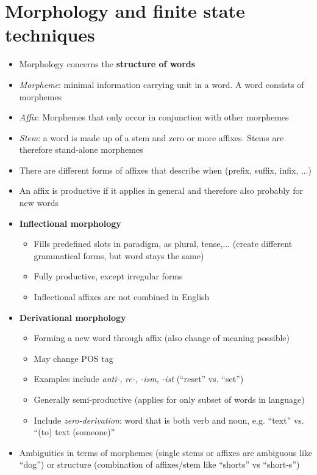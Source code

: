 \section{Morphology and finite state techniques}
\begin{itemize}
	\item Morphology concerns the \textbf{structure of words}
	\item \textit{Morpheme}: minimal information carrying unit in a word. A word consists of morphemes
	\item \textit{Affix}: Morphemes that only occur in conjunction with other morphemes
	\item \textit{Stem}: a word is made up of a stem and zero or more affixes. Stems are therefore stand-alone morphemes
	\item There are different forms of affixes that describe when (prefix, suffix, infix, ...)
	\item An affix is productive if it applies in general and therefore also probably for new words
	\item \textbf{Inflectional morphology}
	\begin{itemize}
		\item Fills predefined slots in paradigm, as plural, tense,... (create different grammatical forms, but word stays the same)
		\item Fully productive, except irregular forms
		\item Inflectional affixes are not combined in English
	\end{itemize}
	\item \textbf{Derivational morphology}
	\begin{itemize}
		\item Forming a new word through affix (also change of meaning possible)
		\item May change POS tag
		\item Examples include \textit{anti-}, \textit{re-}, \textit{-ism}, \textit{-ist} (``reset'' vs. ``set'')
		\item Generally semi-productive (applies for only subset of words in language)
		\item Include \textit{zero-derivation}: word that is both verb and noun, e.g. ``text'' vs. ``(to) text (someone)''
	\end{itemize}
	\item Ambiguities in terms of morphemes (single stems or affixes are ambiguous like ``dog'') or structure (combination of affixes/stem like ``shorts'' vs ``short-s'')

\end{itemize}
